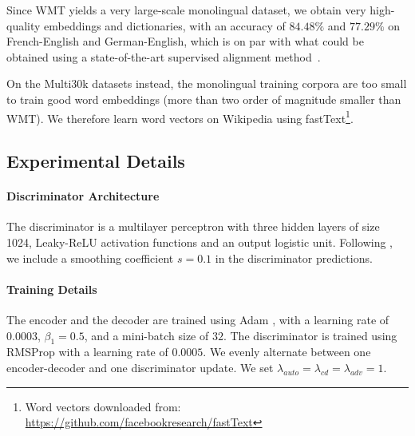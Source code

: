 \documentclass{article} \usepackage{iclr2018_conference,times}
\begin{document}
Since WMT yields a very large-scale monolingual dataset, we obtain very high-quality embeddings and dictionaries, with an accuracy of $84.48\%$ and $77.29\%$ on French-English and German-English, which is on par with what could be obtained using a state-of-the-art supervised alignment method~\citep{wordalign17}.
 
On the Multi30k datasets instead, the monolingual training corpora are too small to train good word embeddings (more than two order of magnitude smaller than WMT). We therefore learn word vectors on Wikipedia using fastText\footnote{Word vectors downloaded from: \url{https://github.com/facebookresearch/fastText}}.

\subsection{Experimental Details}

\paragraph{Discriminator Architecture} The discriminator is a multilayer perceptron with three hidden layers of size 1024, Leaky-ReLU activation functions and an output logistic unit. Following \cite{goodfellow2016nips}, we include a smoothing coefficient $s=0.1$ in the discriminator predictions. 

\paragraph{Training Details} The encoder and the decoder are trained using Adam \citep{kingma2014adam}, with a learning rate of $0.0003$, $\beta_1 = 0.5$, and a mini-batch size of $32$. The discriminator is trained using RMSProp \citep{Tieleman2012} with a learning rate of $0.0005$. We evenly alternate  between one encoder-decoder and one discriminator update. We set $\lambda_{auto} = \lambda_{cd} = \lambda_{adv} = 1$.
\end{document}
